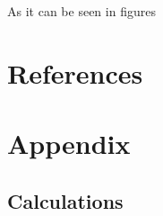 \documentclass[a4paper, 12pt]{article}
\begin{document}
As it can be seen in figures 


\section{References}
\printbibliography


\section{Appendix}

\subsection{Calculations}
\end{document}
